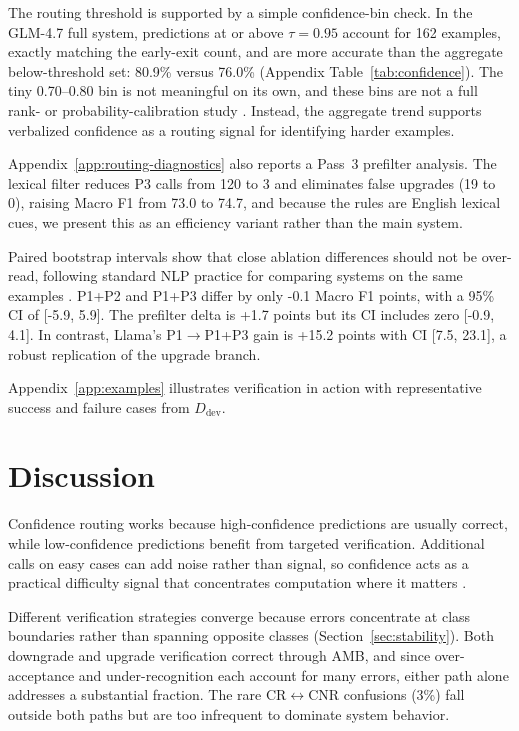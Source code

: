 \documentclass[11pt]{article}
\newcommand{\rev}[1]{#1}
\begin{document}
The routing threshold is supported by a simple confidence-bin check. In the GLM-4.7 full system, predictions at or above $\tau{=}0.95$ account for \rev{162 examples, exactly matching the early-exit count}, and are more accurate than the aggregate below-threshold set: 80.9\% versus 76.0\% (Appendix Table~\ref{tab:confidence}). The tiny 0.70--0.80 bin is not meaningful on its own, and these bins are not a full rank- or probability-calibration study \citep{huang2024rankcalibration,li2025harmonized}. Instead, the aggregate trend supports verbalized confidence as a routing signal for identifying harder examples.

\rev{Appendix~\ref{app:routing-diagnostics} also reports a Pass~3 prefilter analysis. The lexical filter reduces P3 calls from 120 to 3 and eliminates false upgrades (19 to 0), raising Macro F1 from 73.0 to 74.7, and because the rules are English lexical cues, we present this as an efficiency variant rather than the main system.}

Paired bootstrap intervals show that close ablation differences should not be over-read, following standard NLP practice for comparing systems on the same examples \citep{koehn2004statistical,dror2018hitchhiker}. P1+P2 and P1+P3 differ by only -0.1 Macro F1 points, with a 95\% CI of [-5.9, 5.9]. The prefilter delta is +1.7 points but its CI includes zero [-0.9, 4.1]. In contrast, Llama's P1$\rightarrow$P1+P3 gain is +15.2 points with CI [7.5, 23.1], a robust replication of the upgrade branch.

Appendix~\ref{app:examples} illustrates verification in action with representative success and failure cases from $D_{\text{dev}}$.

\section{Discussion}

Confidence routing works because high-confidence predictions are usually correct, while low-confidence predictions benefit from targeted verification. Additional calls on easy cases can add noise rather than signal, so confidence acts as a practical difficulty signal that concentrates computation where it matters \citep{gupta2024lmcascades,schuster2022calm}.

Different verification strategies converge because errors concentrate at class boundaries rather than spanning opposite classes (Section~\ref{sec:stability}). Both downgrade and upgrade verification correct through AMB, and since over-acceptance and under-recognition each account for many errors, either path alone addresses a substantial fraction. The rare CR$\leftrightarrow$CNR confusions (3\%) fall outside both paths but are too infrequent to dominate system behavior.
\end{document}
